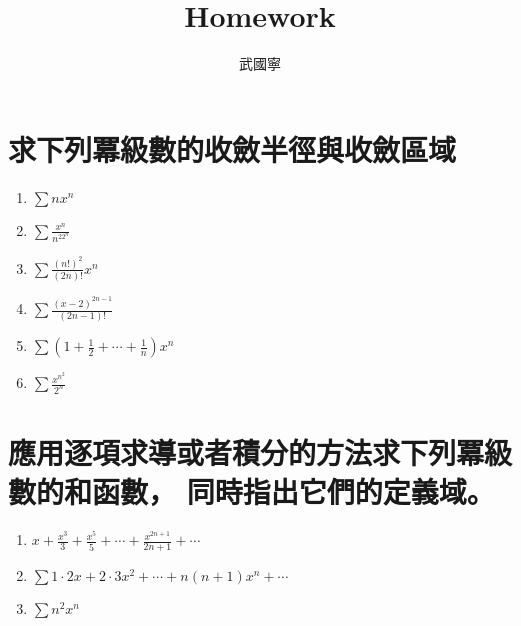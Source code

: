 \documentclass[a4paper,12pt]{article}
\begin{document}
\begin{CJK*}{UTF8}{bsmi}
\newtheorem{theorem}{定理}
\newtheorem{lemma}{引理}
\newtheorem{definition}{定義}
\newtheorem{example}{例子}
\newtheorem{corollary}{推論}
\newtheorem{remark}{注}
\let\oldref\ref
\renewcommand{\ref}[1]{\rm{(\oldref{#1})}}
\renewcommand{\headrulewidth}{0.4pt}
\renewcommand{\footrulewidth}{0.4pt}

\title{Homework}
\author{武國寧}
\date{}
\maketitle
\section{求下列冪級數的收斂半徑與收斂區域}
    \begin{enumerate}[label={\rm(\arabic*)}]
        \item $\displaystyle \sum nx^n$
        \item $\displaystyle \sum \frac{x^n}{n^22^n}$
        \item $\displaystyle \sum \frac{(n!)^2}{(2n)!} x^n$
        \item $\displaystyle \sum \frac{(x-2)^{2n-1}}{(2n-1)!} $
        \item $\displaystyle \sum \left(1 + \frac{1}{2} + \cdots + \frac{1}{n}\right)x^n $
        \item $\displaystyle \sum \frac{x^{n^2}}{2^n}$
    \end{enumerate}

\section{應用逐項求導或者積分的方法求下列冪級數的和函數，
         同時指出它們的定義域。}
    \begin{enumerate}[label={\rm(\arabic*)}]
        \item $\displaystyle x + \frac{x^3}{3} + \frac{x^5}{5} + \cdots + \frac{x^{2n+1}}{2n+1} + \cdots$
        \item $\displaystyle \sum 1\cdot 2x + 2\cdot 3x^2 + \cdots + n(n+1)x^n + \cdots $
        \item $\displaystyle \sum n^2x^n$
    \end{enumerate}


\end{CJK*}
\end{document}
